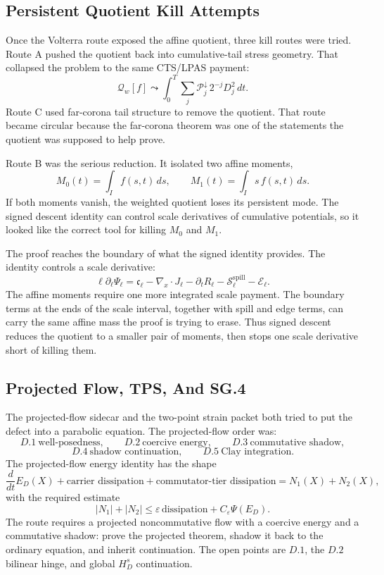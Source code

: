 \subsection{Persistent Quotient Kill Attempts}

Once the Volterra route exposed the affine quotient, three kill routes were
tried.
Route A pushed the quotient back into cumulative-tail stress geometry.
That collapsed the problem to the same CTS/LPAS payment:
\[
  \mathcal Q_w[f]
  \leadsto
  \int_0^T\sum_j\mathcal P_j^\downarrow\,2^{-j}D_j^2\,dt .
\]
Route C used far-corona tail structure to remove the quotient.
That route became circular because the far-corona theorem was one of the
statements the quotient was supposed to help prove.

Route B was the serious reduction.
It isolated two affine moments,
\[
  M_0(t)=\int_I f(s,t)\,ds,
  \qquad
  M_1(t)=\int_I s\,f(s,t)\,ds .
\]
If both moments vanish, the weighted quotient loses its persistent mode.
The signed descent identity can control scale derivatives of cumulative
potentials, so it looked like the correct tool for killing \(M_0\) and \(M_1\).

The proof reaches the boundary of what the signed identity provides.
The identity controls a scale derivative:
\[
  \ell\partial_\ell\Psi_\ell
  =
  \mathfrak c_\ell-\nabla_x\cdot J_\ell-\partial_tR_\ell
  -\mathcal S_\ell^{\mathrm{spill}}-\mathcal E_\ell .
\]
The affine moments require one more integrated scale payment.
The boundary terms at the ends of the scale interval, together with spill and
edge terms, can carry the same affine mass the proof is trying to erase.
Thus signed descent reduces the quotient to a smaller pair of moments, then
stops one scale derivative short of killing them.

\subsection{Projected Flow, TPS, And SG.4}

The projected-flow sidecar and the two-point strain packet both tried to put
the defect into a parabolic equation.
The projected-flow order was:
\[
  D.1\ \text{well-posedness},\qquad
  D.2\ \text{coercive energy},\qquad
  D.3\ \text{commutative shadow},
\]
\[
  D.4\ \text{shadow continuation},\qquad
  D.5\ \text{Clay integration}.
\]
The projected-flow energy identity has the shape
\[
  \frac{d}{dt}E_D(X)
  +\text{carrier dissipation}
  +\text{commutator-tier dissipation}
  =
  N_1(X)+N_2(X),
\]
with the required estimate
\[
  |N_1|+|N_2|
  \le
  \varepsilon\,\text{dissipation}+C_\varepsilon\Psi(E_D).
\]
The route requires a projected noncommutative flow with a coercive energy and a
commutative shadow: prove the projected theorem, shadow it back to the ordinary
equation, and inherit continuation.
The open points are \(D.1\), the \(D.2\) bilinear hinge, and global
\(H_D^s\) continuation.

